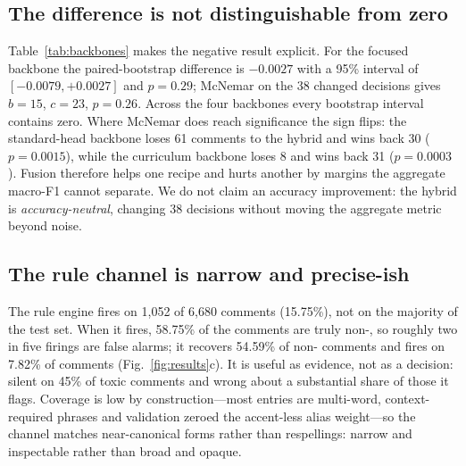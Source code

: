\subsection{The difference is not distinguishable from zero}
\label{sec:significance-results}

Table~\ref{tab:backbones} makes the negative result explicit. For the focused
backbone the paired-bootstrap difference is $-0.0027$ with a 95\% interval of
$[-0.0079,+0.0027]$ and $p=0.29$; McNemar on the 38 changed decisions gives $b=15$,
$c=23$, $p=0.26$. Across the four backbones every bootstrap interval contains zero.
Where McNemar does reach significance the sign flips: the standard-head backbone
loses 61 comments to the hybrid and wins back 30 ($p=0.0015$), while the curriculum
backbone loses 8 and wins back 31 ($p=0.0003$). Fusion therefore helps one recipe and
hurts another by margins the aggregate macro-F1 cannot separate. We do not claim an
accuracy improvement: the hybrid is \emph{accuracy-neutral}, changing 38 decisions
without moving the aggregate metric beyond noise.

\subsection{The rule channel is narrow and precise-ish}
\label{sec:rule-channel-results}

The rule engine fires on 1{,}052 of 6{,}680 comments (15.75\%), not on the majority
of the test set. When it fires, 58.75\% of the comments are truly non-\clean{}, so
roughly two in five firings are false alarms; it recovers 54.59\% of non-\clean{}
comments and fires on 7.82\% of \clean{} comments (Fig.~\ref{fig:results}c). It is
useful as evidence, not as a decision: silent on 45\% of toxic comments and wrong
about a substantial share of those it flags. Coverage is low by construction---most
entries are multi-word, context-required phrases and validation zeroed the
accent-less alias weight---so the channel matches near-canonical forms rather than
respellings: narrow and inspectable rather than broad and opaque.
